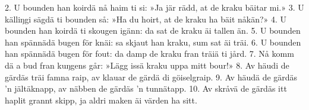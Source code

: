 2.  U bounden han koirdä nå haim ti si:
    »Ja jär rädd, at de kraku bäitar mi.»
3.  U källiŋgi sägdä ti bounden så:
    »Ha du hoirt, at de kraku ha bäit nåkän?»
4.  U bounden han koirdä ti skougen igänn:
    da sat de kraku äi tallen än.
5.  U bounden han spännädä bugen för knäi:
    sa skjaut han kraku, sum sat äi träi.
6.  U bounden han spännädä bugen för fout:
    da damp de kraku fran träiä ti jård.
7.  Nå komm dä a bud fran kuŋgens går:
    »Lägg issä kraku uppa mitt bour!»
8.  Av häudi de gärdäs träi famna raip,
    av klauar de gärdä di göiselgraip.
9.  Av häudä de gärdäs ’n jältäknapp,
    av näbben de gärdäs ’n tunnätapp.
10. Av skråvä de gärdäs itt haplit grannt skipp,
    ja aldri maken äi värden ha sitt.
